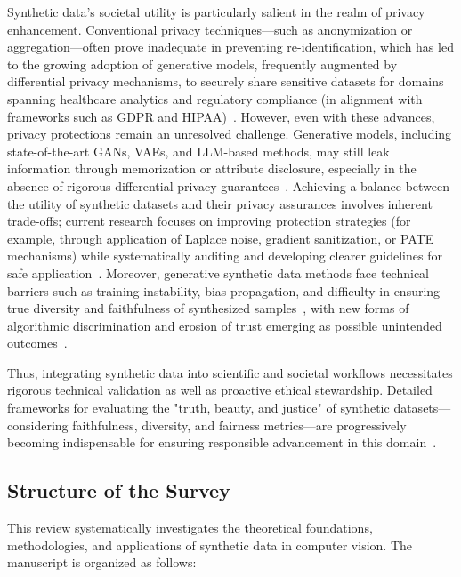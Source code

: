 \documentclass[sigconf]{acmart}
\begin{document}
Synthetic data’s societal utility is particularly salient in the realm of privacy enhancement. Conventional privacy techniques—such as anonymization or aggregation—often prove inadequate in preventing re-identification, which has led to the growing adoption of generative models, frequently augmented by differential privacy mechanisms, to securely share sensitive datasets for domains spanning healthcare analytics and regulatory compliance (in alignment with frameworks such as GDPR and HIPAA)~\cite{ref5,ref6,ref12,ref13}. However, even with these advances, privacy protections remain an unresolved challenge. Generative models, including state-of-the-art GANs, VAEs, and LLM-based methods, may still leak information through memorization or attribute disclosure, especially in the absence of rigorous differential privacy guarantees~\cite{ref5,ref12,ref13}. Achieving a balance between the utility of synthetic datasets and their privacy assurances involves inherent trade-offs; current research focuses on improving protection strategies (for example, through application of Laplace noise, gradient sanitization, or PATE mechanisms) while systematically auditing and developing clearer guidelines for safe application~\cite{ref12,ref13}. Moreover, generative synthetic data methods face technical barriers such as training instability, bias propagation, and difficulty in ensuring true diversity and faithfulness of synthesized samples~\cite{ref5,ref14}, with new forms of algorithmic discrimination and erosion of trust emerging as possible unintended outcomes~\cite{ref12,ref35,ref87}.

Thus, integrating synthetic data into scientific and societal workflows necessitates rigorous technical validation as well as proactive ethical stewardship. Detailed frameworks for evaluating the "truth, beauty, and justice" of synthetic datasets—considering faithfulness, diversity, and fairness metrics—are progressively becoming indispensable for ensuring responsible advancement in this domain~\cite{ref14,ref87}.

\subsection{Structure of the Survey}

This review systematically investigates the theoretical foundations, methodologies, and applications of synthetic data in computer vision. The manuscript is organized as follows:
\end{document}

